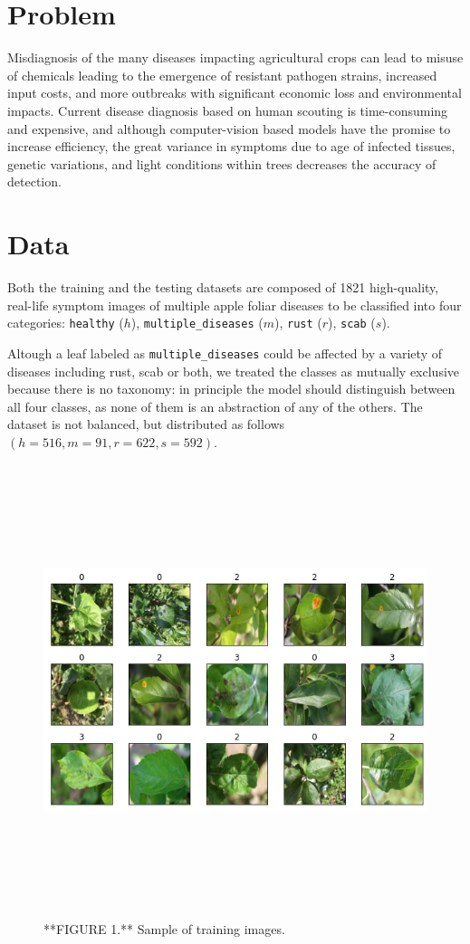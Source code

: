\documentclass{acm_proc_article-sp}
\begin{document}
\hypertarget{problem}{%
\section{Problem}\label{problem}}

Misdiagnosis of the many diseases impacting agricultural crops can lead
to misuse of chemicals leading to the emergence of resistant pathogen
strains, increased input costs, and more outbreaks with significant
economic loss and environmental impacts. Current disease diagnosis based
on human scouting is time-consuming and expensive, and although
computer-vision based models have the promise to increase efficiency,
the great variance in symptoms due to age of infected tissues, genetic
variations, and light conditions within trees decreases the accuracy of
detection.

\hypertarget{data}{%
\section{Data}\label{data}}

Both the training and the testing datasets are composed of 1821
high-quality, real-life symptom images of multiple apple foliar diseases
to be classified into four categories: \texttt{healthy} (\(h\)),
\texttt{multiple\_diseases} (\(m\)), \texttt{rust} (\(r\)),
\texttt{scab} (\(s\)).

Altough a leaf labeled as \texttt{multiple\_diseases} could be affected
by a variety of diseases including rust, scab or both, we treated the
classes as mutually exclusive because there is no taxonomy: in principle
the model should distinguish between all four classes, as none of them
is an abstraction of any of the others. The dataset is not balanced, but
distributed as follows \((h = 516, m = 91, r = 622, s = 592)\).

\begin{figure}

{\centering \includegraphics[width=800px,height=500]{Images/InputImages} 

}

\caption{**FIGURE 1.** Sample of training images.}\label{fig:input-images}
\end{figure}
\end{document}
